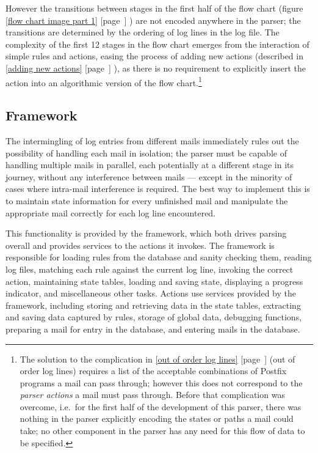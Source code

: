 \documentclass[a4paper,12pt,draft]{article}
\newcommand{\refwithpage}[1]{%
    \empty{}\ref{#1} [page~\pageref{#1}]%
}
\newcommand{\sectionref}[1]{%
    \textsection{}\refwithpage{#1}%
}
\begin{document}
However the transitions between stages in the first half of the flow chart
(figure~\refwithpage{flow chart image part 1}) are not encoded anywhere in
the parser; the transitions are determined by the ordering of log lines in
the log file.  The complexity of the first 12 stages in the flow chart
emerges from the interaction of simple rules and actions, easing the
process of adding new actions (described in \sectionref{adding new
actions}), as there is no requirement to explicitly insert the action into
an algorithmic version of the flow chart.\footnote{The solution to the
complication in \sectionref{out of order log lines} (out of order log
lines) requires a list of the acceptable combinations of Postfix programs a
mail can pass through; however this does not correspond to the
\textit{parser actions\/} a mail must pass through.  Before that
complication was overcome, i.e.\ for the first half of the development of
this parser, there was nothing in the parser explicitly encoding the states
or paths a mail could take; no other component in the parser has any need
for this flow of data to be specified.}



\subsection{Framework}

\label{framework}

The intermingling of log entries from different mails immediately rules out
the possibility of handling each mail in isolation; the parser must be
capable of handling multiple mails in parallel, each potentially at a
different stage in its journey, without any interference between mails ---
except in the minority of cases where intra-mail interference is required.
The best way to implement this is to maintain state information for every
unfinished mail and manipulate the appropriate mail correctly for each log
line encountered.

This functionality is provided by the framework, which both drives parsing
overall and provides services to the actions it invokes.  The framework is
responsible for loading rules from the database and sanity checking them,
reading log files, matching each rule against the current log line,
invoking the correct action, maintaining state tables, loading and saving
state, displaying a progress indicator, and miscellaneous other tasks.
Actions use services provided by the framework, including storing and
retrieving data in the state tables, extracting and saving data captured by
rules, storage of global data, debugging functions, preparing a mail for
entry in the database, and entering mails in the database.
\end{document}

